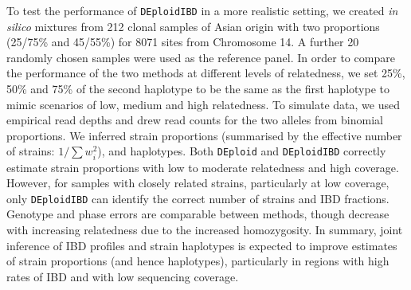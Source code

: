 \documentclass[9pt,lineno]{elife}
\begin{document}
To test the performance of \texttt{DEploidIBD} in a more realistic setting, we created {\it in silico} mixtures from 212 clonal samples of Asian origin with two proportions (25/75\% and 45/55\%) for 8071 sites from Chromosome 14.  A further 20 randomly chosen samples were used as the reference panel. In order to compare the performance of the two methods at different levels of relatedness, we set 25\%, 50\% and 75\% of the second haplotype to be the same as the first haplotype to mimic scenarios of low, medium and high relatedness. To simulate data, we used empirical read depths and drew read counts for the two alleles from binomial proportions.  We inferred strain proportions (summarised by the effective number of strains: $1/\sum w_{i}^{2}$), and haplotypes.  Both \texttt{DEploid} and \texttt{DEploidIBD} correctly estimate strain proportions with low to moderate relatedness and high coverage.  However, for samples with closely related strains, particularly at low coverage, only \texttt{DEploidIBD} can identify the correct number of strains and IBD fractions.  Genotype and phase errors are comparable between methods, though decrease with increasing relatedness due to the increased homozygosity.  In summary, joint inference of IBD profiles and strain haplotypes is expected to improve estimates of strain proportions (and hence haplotypes), particularly in regions with high rates of IBD and with low sequencing coverage.
\end{document}
